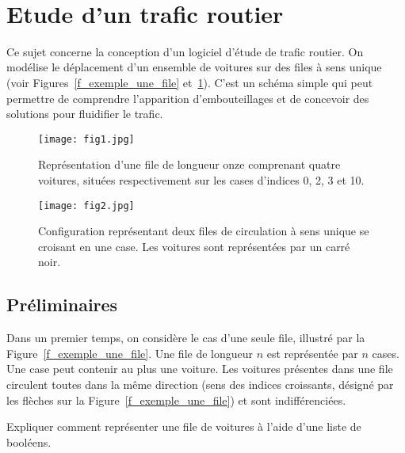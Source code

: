 \exer{[EQD-002]}
\setcounter{numques}{0}~\\

\section{Etude d'un trafic routier}

Ce sujet concerne la conception d'un logiciel d'étude de trafic routier. On modélise le déplacement d'un ensemble de voitures sur des files à sens unique (voir Figures~\ref{f_exemple_une_file} et~\ref{f_exemple_deux_file}). C'est un
schéma simple qui peut permettre de comprendre l'apparition d'embouteillages et de concevoir des
solutions pour fluidifier le trafic.

\begin{figure}[!htb]
\begin{minipage}{0.45\textwidth}
\begin{center}
\texttt{[image: fig1.jpg]}
\caption{\label{f_exemple_une_file} Représentation d'une file de
longueur onze comprenant quatre voitures, situées
respectivement sur les cases d'indices 0, 2, 3 et 10.}
\end{center}
\end{minipage}
\begin{minipage}{0.45\textwidth}
\begin{center}
\texttt{[image: fig2.jpg]}
\caption{\label{f_exemple_deux_file} Configuration représentant deux files de circulation à sens unique se croisant en une case. Les voitures sont représentées par un carré noir.}
\end{center}
\end{minipage}
\end{figure}

\subsection{Préliminaires}



Dans un premier temps, on considère le cas d'une seule file, illustré par la Figure~\ref{f_exemple_une_file}. Une file de
longueur $n$ est représentée par $n$ cases. Une case peut contenir au plus une voiture. Les voitures
présentes dans une file circulent toutes dans la même direction (sens des indices croissants, désigné
par les flèches sur la Figure~\ref{f_exemple_une_file}) et sont indifférenciées.


\question{} Expliquer comment représenter une file de voitures à l'aide d'une liste de booléens.

